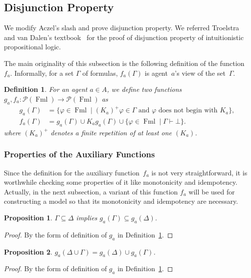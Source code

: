 \documentclass[doctor]{iscs-thesis}
\newcommand{\powerset}[1]{{\mathcal P({#1})}}
\newcommand{\fml}{\operatorname{Fml}}
\newtheorem{proposition}{Proposition}
\newtheorem{definition}{Definition}
\begin{document}
\subsection{Disjunction Property}

We modify Aczel's slash and prove disjunction property.
We referred Troelstra and van Dalen's textbook~\cite[3.5]{troelstra1988constructivism}
for the proof of disjunction property of intuitionistic propositional logic.

The main originality of this subsection is the following definition of the function $f_a$.
Informally, for a set $\Gamma$ of formulas,  $f_a(\Gamma)$ is agent~$a$'s view of the
set~$\Gamma$.
\begin{definition}
 \label{gafa}
 For an agent $a\in A$, we define 
 two functions $g_a, f_a\colon \powerset{\fml}\rightarrow \powerset{\fml}$ as
\begin{align*}
 g_a(\Gamma)&=\{\varphi\in\fml\mid (K_a)^+\varphi\in\Gamma\text{ and }\varphi\text{ does
 not begin with }K_a\},\\
 f_a({\Gamma}) &= g_a(\Gamma) \cup K_ag_a(\Gamma) \cup \{\varphi\in\fml\mid \Gamma\vdash\bot\}.
\end{align*}
 where $(K_a)^+$ denotes a finite repetition of at least one $(K_a)$.
\end{definition}

\subsubsection{Properties of the Auxiliary Functions}

Since the definition for the auxiliary function~$f_a$ is not very straightforward,
it is worthwhile checking some properties of it like monotonicity and idempotency.
Actually, in the next subsection, a variant of this function $f_a$ will be used for
constructing a model so that its monotonicity and idempotency are necessary.

\begin{proposition}
 \label{g_mono}
 $\Gamma\subseteq \Delta$ implies $g_a(\Gamma)\subseteq g_a(\Delta)$.
\end{proposition}
\begin{proof}
 By the form of definition of $g_a$ in Definition~\ref{gafa}.
\end{proof}

\begin{proposition}
 \label{cupg}
 $g_a(\Delta\cup \Gamma) = g_a(\Delta)\cup g_a(\Gamma)$.
\end{proposition}
\begin{proof}
 By the form of definition of $g_a$ in Definition~\ref{gafa}.
\end{proof}
\end{document}
